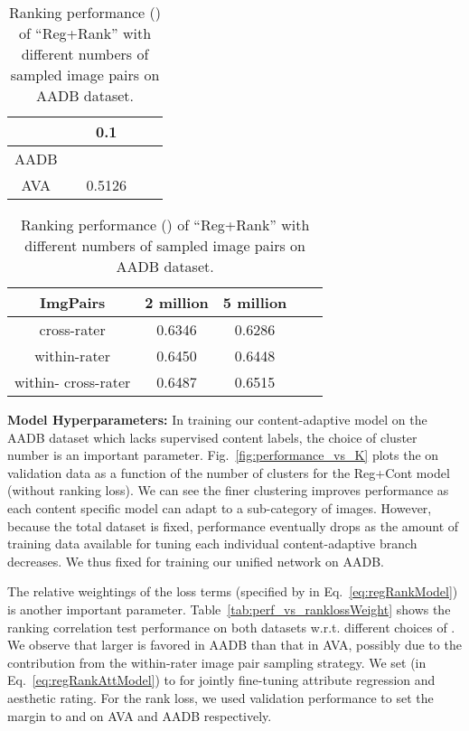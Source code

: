 \documentclass[runningheads]{llncs}
\begin{document}
\begin{table}[t]
\centering
\setlength\tabcolsep{4pt}
\begin{minipage}{0.48\textwidth}
\centering
\small
\centering
\caption{Ranking performance  vs. rank loss weighting  in Eq.~\ref{eq:regRankModel}.}
\begin{tabular}{|c|c|c|c|c|}
\hline
&  & 0.1 &  &  \\
\hline\hline
AADB    &  &  &  &  \\
AVA     &  & 0.5126 &  &  \\
\hline
\end{tabular}
\label{tab:perf_vs_ranklossWeight}
\end{minipage}\hfill
\begin{minipage}{0.48\textwidth}
\small
\centering
\caption{Ranking performance () of ``Reg+Rank'' with different numbers of sampled image pairs on AADB dataset.}
\begin{tabular}{|c|c|c|c|c|}
\hline
	ImgPairs      &  2 million & 5 million \\
\hline
cross-rater & 0.6346 &  0.6286 \\
within-rater & 0.6450 &  0.6448 \\
within-  cross-rater & 0.6487 & 0.6515 \\
\hline
\end{tabular}
\label{tab:Perf_vs_numSampledPairs}
\end{minipage}
\vspace{-0.2in}
\end{table}

\vspace{2mm}
\noindent \textbf{Model Hyperparameters:}
In training our content-adaptive model on the AADB dataset which lacks supervised
content labels, the choice of cluster number is an important parameter.
Fig.~\ref{fig:performance_vs_K} plots the  on validation data
as a function of the number of clusters  for the Reg+Cont model (without
ranking loss).  We can see the finer clustering improves performance as each
content specific model can adapt to a sub-category of images.
However, because
the total dataset is fixed, performance eventually drops as the amount of
training data available for tuning each individual content-adaptive branch
decreases. We thus fixed  for training our unified network on AADB.

The relative weightings of the loss terms (specified by  in Eq.~\ref{eq:regRankModel})
is another important parameter.  Table~\ref{tab:perf_vs_ranklossWeight} shows the ranking
correlation test performance on both datasets w.r.t. different choices of
.
We observe that larger  is favored in AADB than that in AVA,
possibly due to the contribution from the within-rater image pair sampling strategy.
We set  (in Eq.~\ref{eq:regRankAttModel})
to  for jointly fine-tuning attribute regression and aesthetic rating.
For the rank loss, we used validation performance to set
the margin  to  and  on AVA and AADB respectively.
\end{document}
